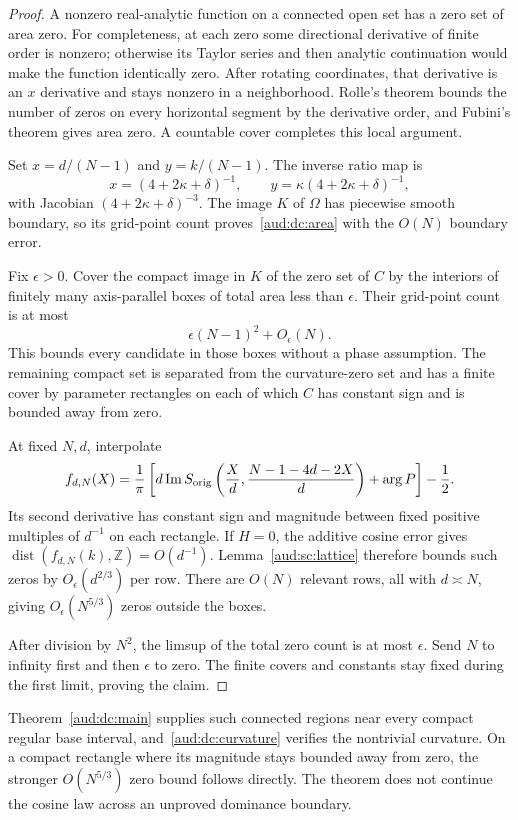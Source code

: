 \documentclass[11pt,a4paper]{article}
\numberwithin{equation}{section}
\begin{document}
\begin{proof}
A nonzero real-analytic function on a connected open set has a zero set of area zero. For completeness, at each zero some directional derivative of finite order is nonzero; otherwise its Taylor series and then analytic continuation would make the function identically zero. After rotating coordinates, that derivative is an $x$ derivative and stays nonzero in a neighborhood. Rolle's theorem bounds the number of zeros on every horizontal segment by the derivative order, and Fubini's theorem gives area zero. A countable cover completes this local argument.

Set $x=d/(N-1)$ and $y=k/(N-1)$. The inverse ratio map is
\[
 x=(4+2\kappa+\delta)^{-1},\qquad
 y=\kappa(4+2\kappa+\delta)^{-1},
\]
with Jacobian $(4+2\kappa+\delta)^{-3}$. The image $K$ of $\Omega$ has piecewise smooth boundary, so its grid-point count proves~\eqref{aud:dc:area} with the $O(N)$ boundary error.

Fix $\epsilon>0$. Cover the compact image in $K$ of the zero set of $C$ by the interiors of finitely many axis-parallel boxes of total area less than $\epsilon$. Their grid-point count is at most
\[
 \epsilon(N-1)^2+O_\epsilon(N).
\]
This bounds every candidate in those boxes without a phase assumption. The remaining compact set is separated from the curvature-zero set and has a finite cover by parameter rectangles on each of which $C$ has constant sign and is bounded away from zero.

At fixed $N,d$, interpolate
\[
 f_{d,N}(X)=\frac1\pi\left[d\operatorname{Im}S_{\rm orig}
 \left(\frac Xd,\frac{N-1-4d-2X}{d}\right)+\arg P\right]-\frac12.
\]
Its second derivative has constant sign and magnitude between fixed positive multiples of $d^{-1}$ on each rectangle. If $H=0$, the additive cosine error gives $\operatorname{dist}(f_{d,N}(k),\mathbb Z)=O(d^{-1})$. Lemma~\ref{aud:sc:lattice} therefore bounds such zeros by $O_\epsilon(d^{2/3})$ per row. There are $O(N)$ relevant rows, all with $d\asymp N$, giving $O_\epsilon(N^{5/3})$ zeros outside the boxes.

After division by $N^2$, the limsup of the total zero count is at most $\epsilon$. Send $N$ to infinity first and then $\epsilon$ to zero. The finite covers and constants stay fixed during the first limit, proving the claim.
\end{proof}

Theorem~\ref{aud:dc:main} supplies such connected regions near every compact regular base interval, and~\eqref{aud:dc:curvature} verifies the nontrivial curvature. On a compact rectangle where its magnitude stays bounded away from zero, the stronger $O(N^{5/3})$ zero bound follows directly. The theorem does not continue the cosine law across an unproved dominance boundary.
\end{document}
